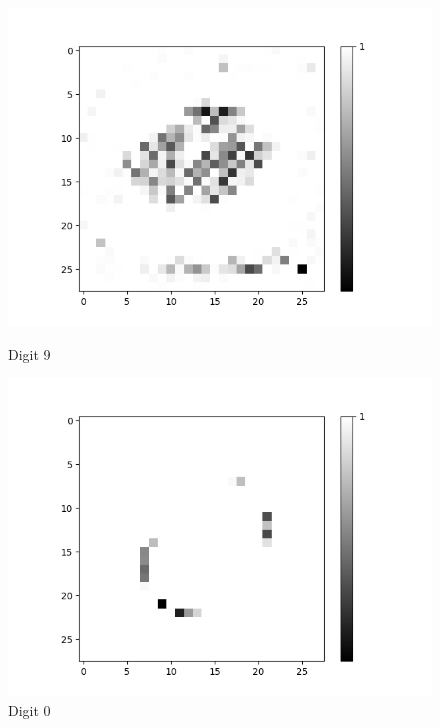 \begin{figure}[H]
\begin{minipage}[b]{0.19\textwidth}
		\includegraphics[width=\textwidth]{AND-OLD(LSM)/Layer0-Neuron-9.png}
		\caption{Digit 9}
	\end{minipage}
	\hfill
	\begin{minipage}[b]{0.19\textwidth}
		\includegraphics[width=\textwidth]{AND-OLD(NO-LSM)/Layer0-Neuron-0.png}
		\caption{Digit 0}
	\end{minipage}
	\begin{minipage}[b]{0.19\textwidth}

\end{minipage}
\end{figure}
